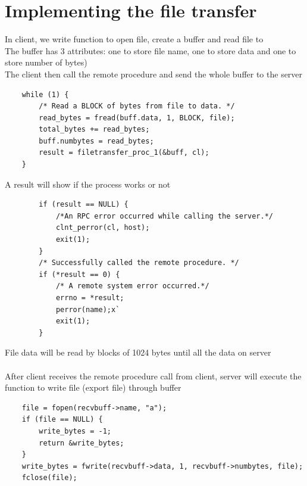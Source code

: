\documentclass[12pt]{article}
\begin{document}
  \section{Implementing the file transfer}
    In client, we write function to open file, create a buffer and read file to  \\
    The buffer has 3 attributes: one to store file name, one to store data and one to store number of bytes) \\
    The client then call the remote procedure and send the whole buffer to the server \\
    \begin{verbatim}
    while (1) {
    	/* Read a BLOCK of bytes from file to data. */
        read_bytes = fread(buff.data, 1, BLOCK, file);
        total_bytes += read_bytes;
        buff.numbytes = read_bytes;
        result = filetransfer_proc_1(&buff, cl);
    }
    \end{verbatim}
    A result will show if the process works or not
    \begin{verbatim}
        if (result == NULL) {
            /*An RPC error occurred while calling the server.*/
            clnt_perror(cl, host);
            exit(1);
        }
        /* Successfully called the remote procedure. */
        if (*result == 0) {
            /* A remote system error occurred.*/
            errno = *result;
            perror(name);x`
            exit(1);
        }
    \end{verbatim}
    File data will be read by blocks of 1024 bytes until all the data on server  \\
     \\
    After client receives the remote procedure call from client, server will execute the function to write file (export file) through buffer
    \begin{verbatim}
    file = fopen(recvbuff->name, "a");
    if (file == NULL) {
        write_bytes = -1;
        return &write_bytes;
    }
    write_bytes = fwrite(recvbuff->data, 1, recvbuff->numbytes, file);
    fclose(file);
    \end{verbatim}
 
\end{document}
